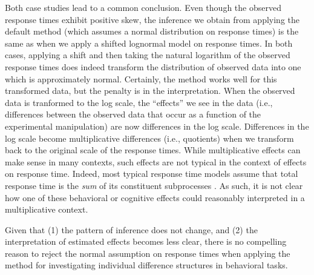 \documentclass[12pt,twoside,a4paper]{article}
\begin{document}
Both case studies lead to a common conclusion. Even though the observed response times exhibit positive skew, the inference we obtain from applying the default \citet{haaf2017} method (which assumes a normal distribution on response times) is the same as when we apply a shifted lognormal model on response times. In both cases, applying a shift and then taking the natural logarithm of the observed response times does indeed transform the distribution of observed data into one which is approximately normal. Certainly, the \citet{haaf2017} method works well for this transformed data, but the penalty is in the interpretation. When the observed data is tranformed to the log scale, the ``effects'' we see in the data (i.e., differences between the observed data that occur as a function of the experimental manipulation) are now differences in the log scale. Differences in the log scale become multiplicative differences (i.e., quotients) when we transform back to the original scale of the response times. While multiplicative effects can make sense in many contexts, such effects are not typical in the context of effects on response time. Indeed, most typical response time models assume that total response time is the \emph{sum} of its constituent subprocesses \citep{schwarz2001,ashby1980}. As such, it is not clear how one of these behavioral or cognitive effects could reasonably interpreted in a multiplicative context.

Given that (1) the pattern of inference does not change, and (2) the interpretation of estimated effects becomes less clear, there is no compelling reason to reject the normal assumption on response times when applying the \citet{haaf2017} method for investigating individual difference structures in behavioral tasks.



\end{document}
